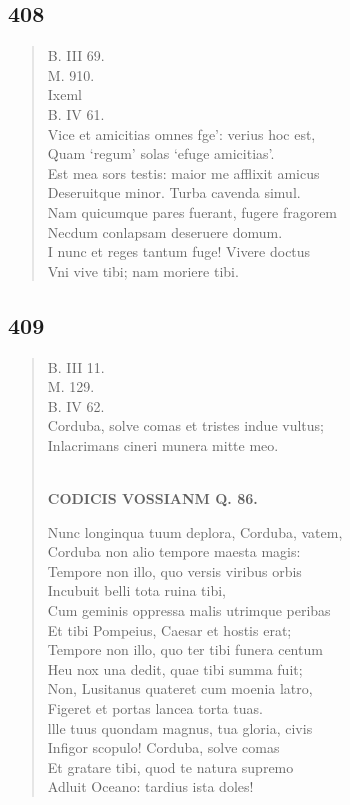 \documentclass[11pt, a4paper]{report}
\begin{document}
            \subsection*{408}
      \begin{verse}
      B. III 69. \\ M. 910. \\ Ixeml \\ B. IV 61. \\ Vice et amicitias omnes fge’: verius hoc est, \\ Quam ‘regum’ solas ‘efuge amicitias’. \\ Est mea sors testis: maior me afflixit amicus \\ Deseruitque minor. Turba cavenda simul. \\ Nam quicumque pares fuerant, fugere fragorem \\ Necdum conlapsam deseruere domum. \\  \lbrack I nunc et reges tantum fuge! Vivere doctus \\ Vni vive tibi; nam moriere tibi. \\ 
      \end{verse}
  
            \subsection*{409}
      \begin{verse}
      B. III 11. \\ M. 129. \\ B. IV 62. \\ Corduba, solve comas et tristes indue vultus; \\ Inlacrimans cineri munera mitte meo. \\ 
        ﻿\pagebreak 
     \marginpar{[317]} \begin{center} \textbf{CODICIS VOSSIANM Q. 86.} \end{center}Nunc longinqua tuum deplora, Corduba, vatem, \\ Corduba non alio tempore maesta magis: \\ Tempore non illo, quo versis viribus orbis \\ Incubuit belli tota ruina tibi, \\ Cum geminis oppressa malis utrimque peribas \\ Et tibi Pompeius, Caesar et hostis erat; \\ Tempore non illo, quo ter tibi funera centum \\ Heu nox una dedit, quae tibi summa fuit; \\ Non, Lusitanus quateret cum moenia latro, \\ Figeret et portas lancea torta tuas. \\ llle tuus quondam magnus, tua gloria, civis \\ Infigor scopulo! Corduba, solve comas \\ Et gratare tibi, quod te natura supremo \\ Adluit Oceano: tardius ista doles! \\ 
      \end{verse}
  
\end{document}
